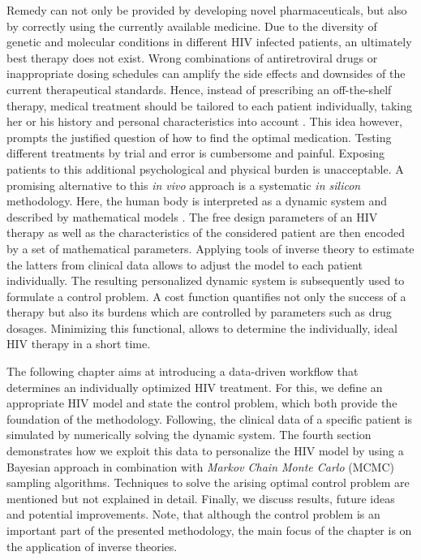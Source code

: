 Remedy can not only be provided by developing novel pharmaceuticals, but also by correctly using the currently available medicine.
Due to the diversity of genetic and molecular conditions in different HIV infected patients, an ultimately best therapy does 
not exist. 
Wrong combinations of antiretroviral drugs or inappropriate dosing schedules can amplify the side effects and downsides of the current 
therapeutical standards.
Hence, instead of prescribing an off-the-shelf therapy, medical treatment should be tailored to each patient individually, taking her or 
his history and personal characteristics into account \cite{lu2018haart}.\newline
This idea however, prompts the justified question of how to find the optimal medication.
Testing different treatments by trial and error is cumbersome and painful.
Exposing patients to this additional psychological and physical burden is unacceptable.\newline
A promising alternative to this \textit{in vivo} approach is a systematic \textit{in silicon} methodology.
Here, the human body is interpreted as a dynamic system and described by mathematical models \cite{rosenberg2007using}.
The free design parameters of an HIV therapy as well as the characteristics of the considered patient are then encoded by a set of mathematical 
parameters.
Applying tools of inverse theory to estimate the latters from clinical data allows to adjust the model to each patient individually.
The resulting personalized dynamic system is subsequently used to formulate a control problem.
A cost function quantifies not only the success of a therapy but also its burdens which are controlled by parameters such as drug dosages.
Minimizing this functional, allows to determine the individually, ideal HIV therapy in a short time.\par

The following chapter aims at introducing a data-driven workflow that determines an individually optimized HIV treatment.
For this, we define an appropriate HIV model and state the control problem, which both provide the foundation of the methodology.
Following, the clinical data of a specific patient is simulated by numerically solving the dynamic system.
The fourth section demonstrates how we exploit this data to personalize the HIV model by using a Bayesian approach in combination with 
\textit{Markov Chain Monte Carlo} (MCMC) sampling algorithms.
Techniques to solve the arising optimal control problem are mentioned but not explained in detail.
Finally, we discuss results, future ideas and potential improvements.\newline
Note, that although the control problem is an important part of the presented methodology, the main focus of the chapter is on the 
application of inverse theories.